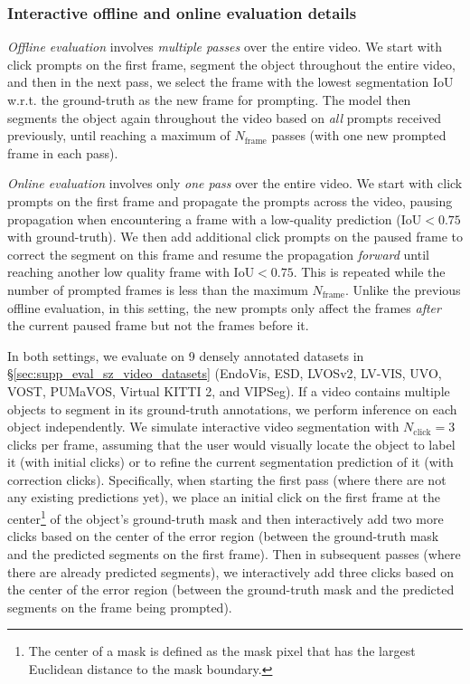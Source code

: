 \documentclass[]{fairmeta}
\newcommand{\secref}[1]{\S\ref{#1}}
\begin{document}
\subsubsection{Interactive offline and online evaluation details} 
\label{app:sec:interactive_eval}

\textit{Offline evaluation} involves \textit{multiple passes} over the entire video. We start with click prompts on the first frame, segment the object throughout the entire video, and then in the next pass, we select the frame with the lowest segmentation $\mathrm{IoU}$ w.r.t. the ground-truth as the new frame for prompting. The model then segments the object again throughout the video based on \textit{all} prompts received previously, until reaching a maximum of $N_\mathrm{frame}$ passes (with one new prompted frame in each pass).

\textit{Online evaluation} involves only \textit{one pass} over the entire video. We start with click prompts on the first frame and propagate the prompts across the video, pausing propagation when encountering a frame with a low-quality prediction ($\mathrm{IoU} < 0.75$ with ground-truth). We then add additional click prompts on the paused frame to correct the segment on this frame and resume the propagation \textit{forward}
until reaching another low quality frame with $\mathrm{IoU} < 0.75$. This is repeated while the number of prompted frames is less than the maximum $N_\mathrm{frame}$. Unlike the previous offline evaluation, in this setting, the new prompts only affect the frames \textit{after} the current paused frame but not the frames before it.

In both settings, we evaluate on 9 densely annotated datasets in \secref{sec:supp_eval_sz_video_datasets} (EndoVis, ESD, LVOSv2, LV-VIS, UVO, VOST, PUMaVOS, Virtual KITTI 2, and VIPSeg). If a video contains multiple objects to segment in its ground-truth annotations, we perform inference on each object independently. We simulate interactive video segmentation with $N_\mathrm{click}=3$ clicks per frame, assuming that the user would visually locate the object to label it (with initial clicks) or to refine the current segmentation prediction of it (with correction clicks). Specifically, when starting the first pass (where there are not any existing predictions yet), we place an initial click on the first frame at the center\footnote{The center of a mask is defined as the mask pixel that has the largest Euclidean distance to the mask boundary.} of the object's ground-truth mask and then interactively add two more clicks based on the center of the error region (between the ground-truth mask and the predicted segments on the first frame). Then in subsequent passes (where there are already predicted segments), we interactively add three clicks based on the center of the error region (between the ground-truth mask and the predicted segments on the frame being prompted).
\end{document}
